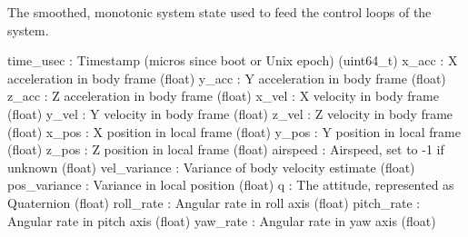 \begin{DoxyVerb}
\begin{DoxyVerb}
\begin{DoxyVerb}The smoothed, monotonic system state used to feed the control loops of
the system.

time_usec                 : Timestamp (micros since boot or Unix epoch) (uint64_t)
x_acc                     : X acceleration in body frame (float)
y_acc                     : Y acceleration in body frame (float)
z_acc                     : Z acceleration in body frame (float)
x_vel                     : X velocity in body frame (float)
y_vel                     : Y velocity in body frame (float)
z_vel                     : Z velocity in body frame (float)
x_pos                     : X position in local frame (float)
y_pos                     : Y position in local frame (float)
z_pos                     : Z position in local frame (float)
airspeed                  : Airspeed, set to -1 if unknown (float)
vel_variance              : Variance of body velocity estimate (float)
pos_variance              : Variance in local position (float)
q                         : The attitude, represented as Quaternion (float)
roll_rate                 : Angular rate in roll axis (float)
pitch_rate                : Angular rate in pitch axis (float)
yaw_rate                  : Angular rate in yaw axis (float)\end{DoxyVerb}
 \mbox{\label{classpymavlink_1_1dialects_1_1v10_1_1MAVLink_adef926494a5a129dc1a81bcf701b486e}} 

\end{DoxyVerb}
\end{DoxyVerb}
